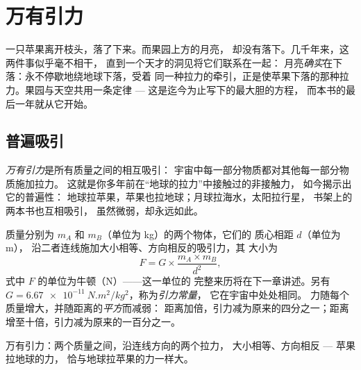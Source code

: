 \chapter{万有引力}\label{ch:g9:gravitation}

一只苹果离开枝头，落了下来。而果园上方的月亮，
却没有落下。几千年来，这两件事似乎毫不相干，
直到一个天才的洞见将它们联系在一起：
月亮\emph{确实}在下落：永不停歇地绕地球下落，受着
同一种拉力的牵引，正是使苹果下落的那种拉力。果园与天空共用一条定律 ---
这是迄今为止写下的最大胆的方程，
而本书的最后一年就从它开始。

\section{普遍吸引}

\begin{definition}[万有引力]\label{def:g9:gravitation:gravitation}
\emph{万有引力}是所有质量之间的相互吸引：
宇宙中每一部分物质都对其他每一部分物质施加拉力。
这就是你多年前在“地球的拉力”中接触过的非接触力，
如今揭示出它的普遍性：
地球拉苹果，苹果也拉地球；月球拉海水，太阳拉行星，
书架上的两本书也互相吸引，
虽然微弱，却永远如此。
\end{definition}

\begin{proposition}[万有引力定律]\label{prop:g9:gravitation:law}
质量分别为 $m_A$ 和 $m_B$（单位为 \unit{kg}）的两个物体，它们的
质心相距 $d$（单位为 \unit{m}），
沿二者连线施加大小相等、方向相反的吸引力，其
大小为
\[
F = G \times \frac{m_A \times m_B}{d^2},
\]
式中 $F$ 的单位为牛顿（\unit{N}）——这一单位的
完整来历将在下一章讲述。另有
$G = \qty{6.67e-11}{N.m^2/kg^2}$，称为\emph{引力常量}，
它在宇宙中处处相同。
力随每个质量增大，并随距离的\emph{平方}而减弱：
距离加倍，引力减为原来的四分之一；距离
增至十倍，引力减为原来的一百分之一。
\end{proposition}

\begin{omfigure}

{\small 万有引力：两个质量之间，沿连线方向的两个拉力，
大小相等、方向相反 --- 苹果拉地球的力，
恰与地球拉苹果的力一样大。}
\end{omfigure}

